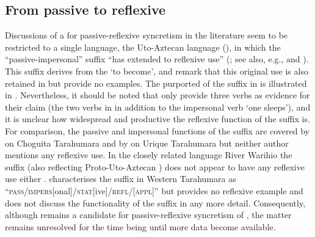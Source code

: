 \subsection{From passive to reflexive} \label{diachrony:pass2refl}
Discussions of a  for passive-reflexive syncretism in the literature seem to be restricted to a single language, the Uto-Aztecan language  (), in which the “passive-impersonal” suffix  “has extended to reflexive use” (\citealt[803]{langacker:munro:1975}; see also, e.g., \citealt[18]{anderson:al:1976} and \citealt[252]{dik:1983}). This suffix derives from the    ‘to become’, and \cite[798]{langacker:munro:1975} remark that this original use is also retained in  but provide no examples. The purported  of the suffix in  is illustrated in . Nevertheless, it should be noted that \citeauthor{langacker:munro:1975} only provide three verbs as evidence for their claim (the two verbs in  in addition to the impersonal verb  ‘one sleeps’), and it is unclear how widespread and productive the reflexive function of the suffix  is. For comparison, the passive and impersonal functions of the suffix  are covered by \cite{caballero:2008} on Choguita Tarahumara and by \cite{jara:2013} on Urique Tarahumara but neither author mentions any reflexive use. In the closely related language River Warihio the suffix  (also reflecting Proto-Uto-Aztecan ) does not appear to have any reflexive use either \citep{armendariz:2006}. \cite[32]{burgess:1984} characterises the suffix  in Western Tarahumara as “\textsc{pass/impers}[onal]\textsc{/stat}[ive]\textsc{/refl/[appl]}” but provides no reflexive example and does not discuss the functionality of the suffix in any more detail. Consequently, although  remains a candidate for passive-reflexive syncretism of , the matter remains unresolved for the time being until more data become available.

